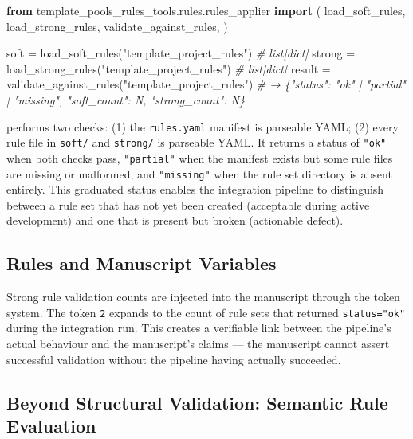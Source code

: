 \documentclass[
]{article}
\newenvironment{Shaded}{}{}
\newcommand{\CommentTok}[1]{\textcolor[rgb]{0.38,0.63,0.69}{\textit{#1}}}
\newcommand{\ImportTok}[1]{\textcolor[rgb]{0.00,0.50,0.00}{\textbf{#1}}}
\newcommand{\NormalTok}[1]{#1}
\newcommand{\OperatorTok}[1]{\textcolor[rgb]{0.40,0.40,0.40}{#1}}
\newcommand{\StringTok}[1]{\textcolor[rgb]{0.25,0.44,0.63}{#1}}
\begin{document}
\begin{Shaded}
\begin{Highlighting}[]
\ImportTok{from}\NormalTok{ template\_pools\_rules\_tools.rules.rules\_applier }\ImportTok{import}\NormalTok{ (}
\NormalTok{    load\_soft\_rules,}
\NormalTok{    load\_strong\_rules,}
\NormalTok{    validate\_against\_rules,}
\NormalTok{)}

\NormalTok{soft   }\OperatorTok{=}\NormalTok{ load\_soft\_rules(}\StringTok{"template\_project\_rules"}\NormalTok{)    }\CommentTok{\# list[dict]}
\NormalTok{strong }\OperatorTok{=}\NormalTok{ load\_strong\_rules(}\StringTok{"template\_project\_rules"}\NormalTok{)  }\CommentTok{\# list[dict]}
\NormalTok{result }\OperatorTok{=}\NormalTok{ validate\_against\_rules(}\StringTok{"template\_project\_rules"}\NormalTok{)}
\CommentTok{\# → \{"status": "ok" | "partial" | "missing", "soft\_count": N, "strong\_count": N\}}
\end{Highlighting}
\end{Shaded}

 performs two checks: (1) the
\texttt{rules.yaml} manifest is parseable YAML; (2) every rule file in
\texttt{soft/} and \texttt{strong/} is parseable YAML. It returns a
status of \texttt{"ok"} when both checks pass, \texttt{"partial"} when
the manifest exists but some rule files are missing or malformed, and
\texttt{"missing"} when the rule set directory is absent entirely. This
graduated status enables the integration pipeline to distinguish between
a rule set that has not yet been created (acceptable during active
development) and one that is present but broken (actionable defect).

\subsection{Rules and Manuscript
Variables}\label{rules-and-manuscript-variables}

Strong rule validation counts are injected into the manuscript through
the token system. The token \texttt{2} expands to the count of rule sets
that returned \texttt{status="ok"} during the integration run. This
creates a verifiable link between the pipeline's actual behaviour and
the manuscript's claims --- the manuscript cannot assert successful
validation without the pipeline having actually succeeded.

\subsection{Beyond Structural Validation: Semantic Rule
Evaluation}\label{beyond-structural-validation-semantic-rule-evaluation}
\end{document}
